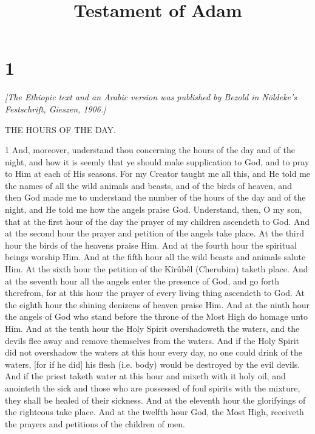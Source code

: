 

\title{Testament of Adam}

\chapter{1}

\par \textit{[The Ethiopic text and an Arabic version was published by Bezold in Nöldeke's Festschrift, Gieszen, 1906.]}

\par THE HOURS OF THE DAY.

\par 1 And, moreover, understand thou concerning the hours of the day and of the night, and how it is seemly that ye should make supplication to God, and to pray to Him at each of His seasons. For my Creator taught me all this, and He told me the names of all the wild animals and beasts, and of the birds of heaven, and then God made me to understand the number of the hours of the day and of the night, and He told me how the angels praise God. Understand, then, O my son, that at the first hour of the day the prayer of my children ascendeth to God. And at the second hour the prayer and petition of the angels take place. At the third hour the birds of the heavens praise Him. And at the fourth hour the spiritual beings worship Him. And at the fifth hour all the wild beasts and animals salute Him. At the sixth hour the petition of the Kîrûbêl (Cherubim) taketh place. And at the seventh hour all the angels enter the presence of God, and go forth therefrom, for at this hour the prayer of every living thing ascendeth to God. At the eighth hour the shining denizens of heaven praise Him. And at the ninth hour the angels of God who stand before the throne of the Most High do homage unto Him. And at the tenth hour the Holy Spirit overshadoweth the waters, and the devils flee away and remove themselves from the waters. And if the Holy Spirit did not overshadow the waters at this hour every day, no one could drink of the waters, [for if he did] his flesh (i.e. body) would be destroyed by the evil devils. And if the priest taketh water at this hour and mixeth with it holy oil, and anointeth the sick and those who are possessed of foul spirits with the mixture, they shall be healed of their sickness. And at the eleventh hour the glorifyings of the righteous take place. And at the twelfth hour God, the Most High, receiveth the prayers and petitions of the children of men.

